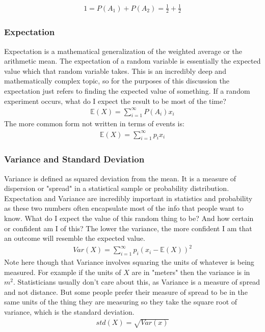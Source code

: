 \documentclass{article}
\begin{document}
\begin{align*}
1 = P(A_1) + P(A_2) = \tfrac{1}{2} + \tfrac{1}{2}
\end{align*}

\subsubsection{Expectation}
Expectation is a mathematical generalization of the weighted average or the arithmetic mean. The expectation of a random variable is essentially the expected value which that random variable takes. This is an incredibly deep and mathematically complex topic, so for the purposes of this discussion the expectation just refers to finding the expected value of something. If a random experiment occurs, what do I expect the result to be most of the time?
\begin{align*}
\mathbb{E}(X) = \sum_{i=1}^{\infty} P(A_i) x_i
\end{align*}
The more common form not written in terms of events is:
\begin{align*}
\mathbb{E}(X) = \sum_{i=1}^{\infty} p_i x_i
\end{align*}

\subsubsection{Variance and Standard Deviation}
Variance is defined as squared deviation from the mean. It is a measure of dispersion or "spread" in a statistical sample or probability distribution. Expectation and Variance are incredibly important in statistics and probability as these two numbers often encapsulate most of the info that people want to know. What do I expect the value of this random thing to be? And how certain or confident am I of this? The lower the variance, the more confident I am that an outcome will resemble the expected value.
\begin{align*}
Var(X) = \sum_{i=1}^{\infty} p_i (x_i-\mathbb{E}(X))^2
\end{align*}
Note here though that Variance involves squaring the units of whatever is being measured. For example if the units of $X$ are in "meters" then the variance is in $m^2$. Statisticians usually don't care about this, as Variance is a measure of spread and not distance. But some people prefer their measure of spread to be in the same units of the thing they are measuring so they take the square root of variance, which is the standard deviation.
\begin{align*}
std(X) = \sqrt{Var(x)}
\end{align*}
\end{document}
